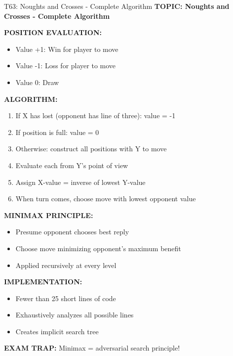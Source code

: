 \documentclass[8pt]{beamer}
\begin{document}
	\begin{frame}{T63: Noughts and Crosses - Complete Algorithm}
		\fontsize{6.5}{7.5}\selectfont
		\textbf{TOPIC: Noughts and Crosses - Complete Algorithm}
		
		\vspace{0.1cm}
		\textbf{POSITION EVALUATION:}
		\begin{itemize}
			\item Value +1: Win for player to move
			\item Value -1: Loss for player to move
			\item Value 0: Draw
		\end{itemize}
		
		\vspace{0.1cm}
		\textbf{ALGORITHM:}
		\begin{enumerate}
			\item If X has lost (opponent has line of three): value = -1
			\item If position is full: value = 0
			\item Otherwise: construct all positions with Y to move
			\item Evaluate each from Y's point of view
			\item Assign X-value = inverse of lowest Y-value
			\item When turn comes, choose move with lowest opponent value
		\end{enumerate}
		
		\vspace{0.1cm}
		\textbf{MINIMAX PRINCIPLE:}
		\begin{itemize}
			\item Presume opponent chooses best reply
			\item Choose move minimizing opponent's maximum benefit
			\item Applied recursively at every level
		\end{itemize}
		
		\vspace{0.1cm}
		\textbf{IMPLEMENTATION:}
		\begin{itemize}
			\item Fewer than 25 short lines of code
			\item Exhaustively analyzes all possible lines
			\item Creates implicit search tree
		\end{itemize}
		
		\textcolor{myred}{\textbf{EXAM TRAP:}} Minimax = \textcolor{myblue}{adversarial search principle}!
	\end{frame}
	
\end{document}
